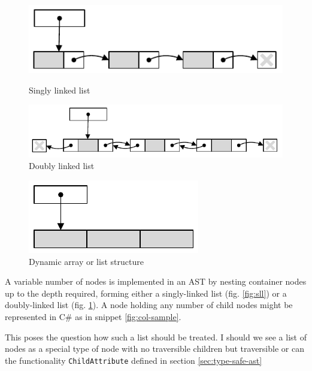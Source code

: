 \documentclass[twoside,openright]{uva-bachelor-thesis}
\newcommand{\includecode}[3]{}
\newcommand{\code}[1]{\texttt{\footnotesize#1}}
\begin{document}
		\begin{figure}[ht]
			\begin{minipage}[b]{0.45\linewidth}
				\centering
				\includegraphics[width=\textwidth]{figures/collections/sll}
				\caption{Singly linked list}
				\label{fig:sll}
			\end{minipage}
			\hspace{0.5cm}
			\begin{minipage}[b]{0.45\linewidth}
				\centering
				\includegraphics[width=\textwidth]{figures/collections/dll}
				\caption{Doubly linked list}
				\label{fig:dll}
			\end{minipage}
		\end{figure}
		\begin{figure}[h]
			\centering
			\includegraphics{figures/collections/list}
			\caption{Dynamic array or list structure}
			\label{fig:list}
		\end{figure}
		
		A variable number of nodes is implemented in an AST by nesting container nodes up to the depth required, forming either a singly-linked list (fig. \ref{fig:sll}) or a doubly-linked list (fig. \ref{fig:dll}). A node holding any number of child nodes might be represented in C\# as in snippet \ref{fig:col-sample}.

		\includecode{lists_as_attribs.cs}{col-sample}{Example of lists as traversible attributes}		
	
		This poses the question how such a list should be treated. I should we see a list of nodes as a special type of node with no traversible children but traversible or can the functionality  \code{ChildAttribute} defined in section \ref{sec:type-safe-ast} 
		
\end{document}
